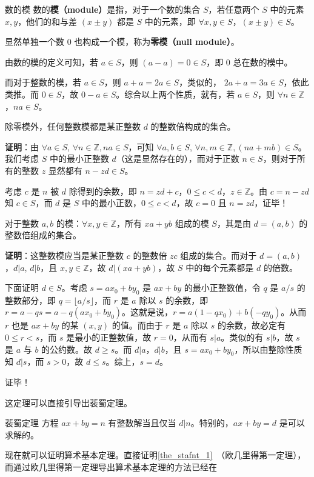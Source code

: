\begin{definition}{数的模}
数的\textbf{模（module）}是指，对于一个数的集合 $S$，若任意两个 $S$ 中的元素 $x, y$，他们的和与差 $(x\pm y)$ 都是 $S$ 中的元素，即 $\forall x, y \in S$，$(x \pm y) \in S$。
\end{definition}
显然单独一个数 $0$ 也构成一个模，称为\textbf{零模（null module）}。

由数的模的定义可知，若 $a \in S$，则 $(a-a)=0 \in S$，即 $0$ 总在数的模中。

而对于整数的模，若 $a \in S$，则 $a + a = 2a\in S$，类似的， $2a + a = 3a\in S$，依此类推。而 $0 \in S$，故 $0 - a \in S$。综合以上两个性质，就有，若 $a \in S$，则 $\forall n \in \mathbb Z$，$na \in S$。

\begin{theorem}{}
除零模外，任何整数模都是某正整数 $d$ 的整数倍构成的集合。
\end{theorem}
\textbf{证明}：由 $\forall a \in S$, $\forall n \in \mathbb Z, na \in S$，可知 $\forall a, b \in S$, $\forall n, m \in \mathbb Z, (na+mb) \in S$。我们考虑 $S$ 中的最小正整数 $d$（这是显然存在的），而对于正数 $n \in S$，则对于所有的整数 $z$ 显然都有 $n - zd \in S$。

考虑 $c$ 是 $n$ 被 $d$ 除得到的余数，即 $n = zd + c$，$0 \le c < d$，$z \in \mathbb Z$。由 $c = n - zd$ 知 $c \in S$，而 $d$ 是 $S$ 中的最小正数，$0 \le c < d$，故 $c = 0$ 且 $n = zd$，证毕！

\begin{theorem}{}
对于整数 $a, b$ 的模：$\forall x, y \in \mathbb Z$，所有 $xa+yb$ 组成的模 $S$，其是由 $d=(a, b)$ 的整数倍组成的集合。
\end{theorem}
\textbf{证明}：这整数模应当是某正整数 $c$ 的整数倍 $zc$ 组成的集合。而对于 $d = (a, b)$，$d | a$, $d | b$，且 $x, y \in \mathbb Z$，故 $d | (xa+yb)$，故 $S$ 中的每个元素都是 $d$ 的倍数。

下面证明 $d \in S$。考虑 $s=a x_0 + b y_0$ 是 $ax+by$ 的最小正整数值，令 $q$ 是 $a/s$ 的整数部分，即 $q = \lfloor a/s \rfloor$，而 $r$ 是 $a$ 除以 $s$ 的余数，即 $r = a - q s = a - q(a x_0 + b y_0)$。这就是说，$r = a(1-q x_0) + b(-q y_0)$。从而 $r$ 也是 $ax+by$ 的某 $(x, y)$ 的值。而由于 $r$ 是 $a$ 除以 $s$ 的余数，故必定有 $0 \le r < s$，而 $s$ 是最小的正整数值，故 $r=0$，从而有 $s | a$。类似的有 $s | b$，故 $s$ 是 $a$ 与 $b$ 的公约数。故 $d \ge s$。而 $d|a$，$d|b$，且 $s = ax_0 + by_0$，所以由整除性质知 $d|s$，而 $s > 0$，故 $d \le s$。综上，$s = d$。

证毕！

这定理可以直接引导出裴蜀定理。
\begin{theorem}{裴蜀定理}
方程 $ax + by = n$ 有整数解当且仅当 $d | n$。特别的，$ax+by = d$ 是可以求解的。
\end{theorem}

现在就可以证明算术基本定理。直接证明\autoref{the_stafnt_1}~（欧几里得第一定理），而通过欧几里得第一定理导出算术基本定理的方法已经在
